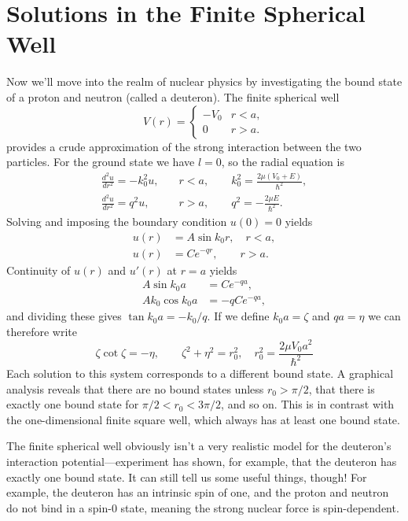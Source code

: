 \documentclass[../p116main.tex]{subfiles}
\begin{document}
\section{Solutions in the Finite Spherical Well}
Now we'll move into the realm of nuclear physics by investigating the bound state of a proton and neutron (called a deuteron).
The finite spherical well
\[ V(r) = \begin{cases} -V_0 & r < a, \\ 0 & r > a. \end{cases} \]
provides a crude approximation of the strong interaction between the two particles.
For the ground state we have $l=0$, so the radial equation is
\begin{align*}
    \frac{d^2u}{dr^2} = -k_0^2 u, &\quad r < a, \qquad k_0^2 = \frac{2\mu (V_0 + E)}{\hbar^2}, \\
    \frac{d^2u}{dr^2} = q^2 u, &\quad r > a, \qquad q^2 = -\frac{2\mu E}{\hbar^2}.
\end{align*}
Solving and imposing the boundary condition $u(0) = 0$ yields
\begin{align*}
    u(r) &= A \sin k_0 r, \quad r < a, \\
    u(r) &= C e^{-qr}, \qquad r > a.
\end{align*}
Continuity of $u(r)$ and $u'(r)$ at $r=a$ yields
\begin{align*}
    A \sin k_0 a &= C e^{-qa}, \\
    A k_0 \cos k_0 a &= -q C e^{-qa},
\end{align*}
and dividing these gives $\tan k_0 a = -k_0 / q$.
If we define $k_0 a = \zeta$ and $qa = \eta$ we can therefore write
\[ \zeta \cot \zeta = -\eta, \qquad \zeta^2 + \eta^2 = r_0^2, \quad r_0^2 = \frac{2\mu V_0 a^2}{\hbar^2} \]
Each solution to this system corresponds to a different bound state.
A graphical analysis reveals that there are no bound states unless $r_0 > \pi / 2$, that there is exactly one bound state for $\pi / 2 < r_0 < 3\pi / 2$, and so on.
This is in contrast with the one-dimensional finite square well, which always has at least one bound state.

The finite spherical well obviously isn't a very realistic model for the deuteron's interaction potential---experiment has shown, for example, that the deuteron has exactly one bound state.
It can still tell us some useful things, though!
For example, the deuteron has an intrinsic spin of one, and the proton and neutron do not bind in a spin-0 state, meaning the strong nuclear force is spin-dependent.
\end{document}
